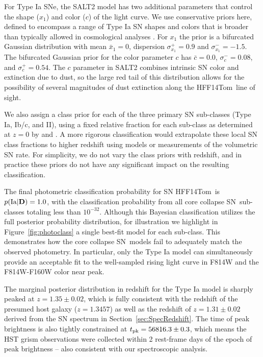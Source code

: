 \documentclass[iop]{emulateapj}
\def\tomas{HFF14Tom}
\newcommand{\CCSN}{core collapse SN}
\begin{document}
For Type Ia SNe, the SALT2 model has two additional parameters that
control the shape ($x_1$) and color ($c$) of the light curve.  We use
conservative priors here, defined to encompass a range of Type Ia SN
shapes and colors that is broader than typically allowed in
cosmological analyses \citep[see
e.g.,][]{Kessler:2009b,Sullivan:2011,Rest:2014}. For $x_1$ the prior
is a bifurcated Gaussian distribution with mean $\bar{x}_1=0$,
dispersion $\sigma_{x_1}^+={0.9}$ and $\sigma_{x_1}^-={-1.5}$.  The
bifurcated Gaussian prior for the color parameter $c$ has
$\bar{c}=0.0$, $\sigma_c^-=0.08$, and $\sigma_c^+=0.54$.  The $c$
parameter in SALT2 combines intrinsic SN color and extinction due to
dust, so the large red tail of this distribution allows for the
possibility of several magnitudes of dust extinction along the \tomas\
line of sight.

We also assign a class prior for each of the three primary SN
sub-classes (Type Ia, Ib/c, and II), using a fixed relative fraction for
each sub-class as determined at $z=0$ by \citet{Smartt:2009}
and \citet{Li:2011a}.  A more rigorous classification would extrapolate
these local SN class fractions to higher redshift using models or
measurements of the volumetric SN rate.  For simplicity, we do not
vary the class priors with redshift, and in practice these priors do
not have any significant impact on the resulting classification.

The final photometric classification probability for SN \tomas\ is
$p({\rm Ia}|{\rm {\bf D}})=1.0$, with the classification probability
from all \CCSN\ sub-classes totaling less than
$10^{-32}$.  Although this Bayesian classification utilizes
the full posterior probability distribution, for illustration we
highlight in Figure~\ref{fig:photoclass} a single best-fit model for
each sub-class. This demonstrates how the \CCSN\ models fail to
adequately match the observed photometry. In particular, only the Type
Ia model can simultaneously provide an acceptable fit to the
well-sampled rising light curve in F814W and the F814W-F160W color
near peak.

The marginal posterior distribution in redshift for the Type Ia model
is sharply peaked at $z=1.35\pm0.02$, which is fully
consistent with the redshift of the presumed host galaxy ($z=1.3457$)
as well as the redshift of $z=1.31\pm0.02$ derived from the SN
spectrum in Section~\ref{sec:SpecRedshift}.  The time of peak
brightness is also tightly constrained at $t_{\rm pk}=56816.3\pm0.3$,
which means the HST grism observations were collected within 2
rest-frame days of the epoch of peak brightness -- also consistent
with our spectroscopic analysis.
\end{document}
